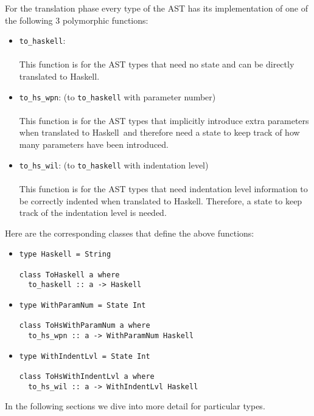 \documentclass[diploma]{softlab-thesis}
\def\H{Haskell}
\begin{document}
For the translation phase every type of the AST has its implementation of
one of the following 3 polymorphic functions:

\begin{itemize}
\item
\verb|to_haskell|:\\\\
This function is for the AST types that need no state and can be directly
translated to \H.
\item
\verb|to_hs_wpn|: (to \verb|to_haskell| with parameter number) \\\\
This function is for the AST types that implicitly introduce extra
parameters when translated to \H\ and therefore need a state to keep track
of how many parameters have been introduced.
\item
\verb|to_hs_wil|: (to \verb|to_haskell| with indentation level)\\\\
This function is for the AST types that need indentation level information to
be correctly indented when translated to \H. Therefore, a state to keep track
of the indentation level is needed.\\
\end{itemize}
Here are the corresponding classes that define the above functions:

\begin{itemize}
\item
\begin{verbatim}
type Haskell = String

class ToHaskell a where
  to_haskell :: a -> Haskell
\end{verbatim}

\item
\begin{verbatim}
type WithParamNum = State Int

class ToHsWithParamNum a where
  to_hs_wpn :: a -> WithParamNum Haskell
\end{verbatim}

\item
\begin{verbatim}
type WithIndentLvl = State Int

class ToHsWithIndentLvl a where
  to_hs_wil :: a -> WithIndentLvl Haskell
\end{verbatim}
\end{itemize}
In the following sections we dive into more detail for particular types.
\end{document}
